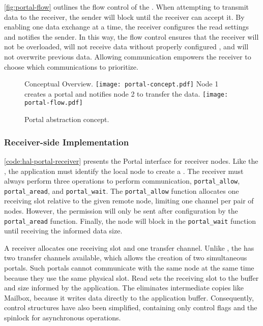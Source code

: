 			\autoref{fig:portal-flow} outlines the flow control of the \portal.
			When attempting to transmit data to the receiver, the sender will block
			until the receiver can accept it. By enabling one data exchange at a time,
			the receiver configures the read settings and notifies the sender. In this way,
			the flow control ensures that the receiver will not be overloaded, will
			not receive data without properly configured \dma, and will not overwrite
			previous data. Allowing communication empowers the receiver to choose which
			communications to prioritize.

			\begin{figure}[!tb]
				\centering%
				\caption{Portal abstraction concept.}%
				\label{fig:portal}%

					{Conceptual Overview.}%
					{\texttt{[image: portal-concept.pdf]}}%
				\hspace{1cm}%
					{Node 1 creates a portal and notifies node 2 to transfer the data.}%
					{\texttt{[image: portal-flow.pdf]}}%

			\end{figure}

			\subsubsection{Receiver-side Implementation}

				\autoref{code:hal-portal-receiver} presents the Portal interface for
				receiver nodes. Like the \mailbox, the application must identify the
				local node to create a \portal. The receiver must always perform
				three operations to perform communication, \ie \texttt{portal\_allow},
				\texttt{portal\_aread}, and \texttt{portal\_wait}. The \texttt{portal\_allow} function allocates one
				receiving slot relative to the given remote node, limiting one
				channel per pair of nodes. However, the permission will only be
				sent after \dma configuration by the \texttt{portal\_aread} function. Finally, the
				node will block in the \texttt{portal\_wait} function until receiving the informed
				data size.

				A receiver allocates one \dnoc receiving slot and one \cnoc transfer
				channel. Unlike \mailbox, the \portal has two transfer channels
				available, which allows the creation of two simultaneous portals.
				Such portals cannot communicate with the same node at the same time
				because they use the same physical slot. Read sets the
				receiving slot to the buffer and size informed by the application.
				The \dma eliminates intermediate copies like Mailbox, because it
				writes data directly to the application buffer. Consequently,
				control structures have also been simplified, containing only
				control flags and the spinlock for asynchronous operations.

